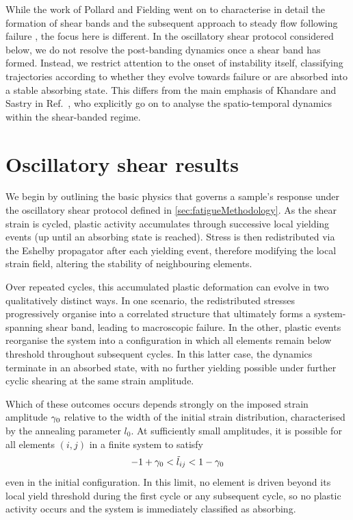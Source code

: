 While the work of Pollard and Fielding went on to characterise in detail the formation of shear bands and the subsequent approach to steady flow following failure \cite{pollard_yielding_2022}, the focus here is different. In the oscillatory shear protocol considered below, we do not resolve the post-banding dynamics once a shear band has formed. Instead, we restrict attention to the onset of instability itself, classifying trajectories according to whether they evolve towards failure or are absorbed into a stable absorbing state. This differs from the main emphasis of Khandare and Sastry in Ref.~\cite{khandareElastoplasticModellingCyclic2026}, who explicitly go on to analyse the spatio-temporal dynamics within the shear-banded regime.

\section{Oscillatory shear results}
We begin by outlining the basic physics that governs a sample’s response under the oscillatory shear protocol defined in \cref{sec:fatigueMethodology}. As the shear strain is cycled, plastic activity accumulates through successive local yielding events (up until an absorbing state is reached). 
Stress is then redistributed via the Eshelby propagator after each yielding event, therefore modifying the local strain field, altering the stability of neighbouring elements. 

Over repeated cycles, this accumulated plastic deformation can evolve in two qualitatively distinct ways. In one scenario, the redistributed stresses progressively organise into a correlated structure that ultimately forms a system-spanning shear band, leading to macroscopic failure. In the other, plastic events reorganise the system into a configuration in which all elements remain below threshold throughout subsequent cycles. In this latter case, the dynamics terminate in an absorbed state, with no further yielding possible under further cyclic shearing at the same strain amplitude.

Which of these outcomes occurs depends strongly on the imposed strain amplitude $\gamma_0$ relative to the width of the initial strain distribution, characterised by the annealing parameter $l_0$.
At sufficiently small amplitudes, it is possible for all elements $(i,j)$ in a finite system to satisfy
\[
    -1+\gamma_0 < \tilde{l}_{ij} < 1-\gamma_0
\]
even in the initial configuration. 
In this limit, no element is driven beyond its local yield threshold during the first cycle or any subsequent cycle, so no plastic activity occurs and the system is immediately classified as absorbing.

